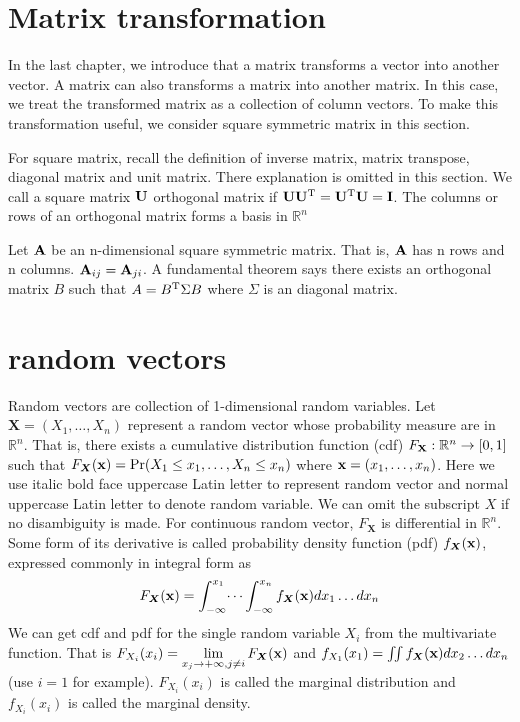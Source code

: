 \section{Matrix transformation}
In the last chapter, we introduce that a matrix transforms a vector into another vector. A matrix can also transforms a matrix into another matrix. In this case, we treat the transformed matrix as a collection of column vectors. To make this transformation useful, we consider square symmetric matrix in this section.

For square matrix, recall the definition of inverse matrix, matrix transpose, diagonal matrix and unit matrix. There explanation is omitted in this section.
We call a square matrix $\mathbf{U}$ orthogonal matrix if $\mathbf{U}\mathbf{U}^{\mathrm{T}} = \mathbf{U}^{\mathrm{T}}\mathbf{U}= \mathbf{I}$. The columns or rows of an orthogonal matrix forms a basis in $\mathbb{R}^n$

Let $\mathbf{A}$ be an n-dimensional square symmetric matrix. That is, $\mathbf{A}$ has n rows and n columns. $\mathbf{A}_{ij} = \mathbf{A}_{ji}$. A fundamental theorem says there exists an orthogonal matrix $B$ such that 
$A = B^{\mathrm{T}} \Sigma B$ where $\Sigma$ is an diagonal matrix.

\section{random vectors}
Random vectors are collection of 1-dimensional random variables. Let $\bm{X} = (X_1, \dots, X_n)$ 
represent a random vector whose probability measure are in $\mathbb{R}^n$.
That is, there exists a cumulative distribution function (cdf) $F_{\mathbf{X}}: \mathbb{R}^n \rightarrow [0,1]$ 
such that $F_{\bm{X}}(\mathbf{x}) = \Pr(X_1 \leq x_1, \dots, X_n \leq x_n)$ where $ \mathbf{x} = (x_1, \dots, x_n)$.
Here we use italic bold face uppercase Latin letter to represent random vector and normal uppercase Latin letter to denote random variable. We can omit the subscript $X$ if no disambiguity is made. For continuous random vector, $F_{\bm{X}}$ is differential in $\mathbb{R}^n$. Some form of its derivative is called probability density function (pdf) $f_{\bm{X}}(\mathbf{x})$, expressed commonly in integral form as
\begin{equation}
F_{\bm{X}}(\mathbf{x}) = \int_{-\infty}^{x_1}\dots\int_{-\infty}^{x_n} f_{\bm{X}}(\mathbf{x}) dx_1 \dots dx_n
\end{equation}
We can get cdf and pdf for the single random variable $X_i$ from the multivariate function. That is
$ F_{X_i}(x_i) = \displaystyle\lim_{x_j \to +\infty, j\neq i} F_{\bm{X}}(\mathbf{x})$ and 
$ f_{X_1}(x_1) = \iint f_{\bm{X}}(\mathbf{x})dx_2 \dots d x_n$ (use $i=1$ for example).
$F_{X_i}(x_i)$ is called the marginal distribution and $f_{X_i}(x_i)$ is called the marginal density.

